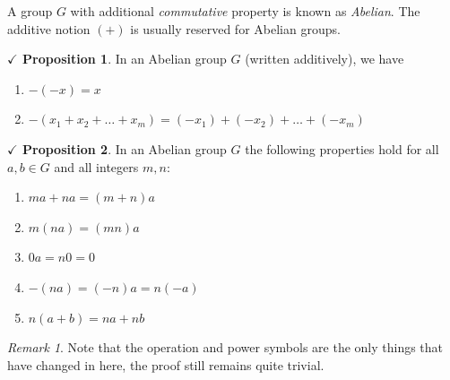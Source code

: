 \documentclass{article}
\theoremstyle{definition}
\theoremstyle{remark}
\newtheorem*{remark}{Remark}
\theoremstyle{definition}
\theoremstyle{definition}
\newtheorem{proposition}{$\checkmark$ Proposition}
\theoremstyle{definition}
\theoremstyle{proof}
\begin{document}
A group $ G $ with additional \emph{commutative} property is known as \emph{Abelian}. The additive notion $ (+) $ is usually reserved for Abelian groups.

\begin{proposition}
	In an Abelian group  $ G $ (written additively), we have
	\begin{enumerate}
		\item{$ -(-x) = x $}
		\item{$ -(x_1 + x_2 + \dots + x_m) = (-x_1) + (-x_2) + \dots + (-x_m) $}
	\end{enumerate}
\end{proposition}
\hrulefill
\begin{proposition}
	In an Abelian group $ G $ the following properties hold for all $ a,b \in G $ and all integers $ m,n $:
	\begin{enumerate}
		\item{$ ma + na = (m+n)a $}
		\item{$ m(na) = (mn) a $}
		\item{$ 0a = n0 = 0 $}
		\item{$ -(na) = (-n)a = n(-a) $}
		\item{$ n(a+b) = na + nb $}
	\end{enumerate}
\end{proposition}
\begin{remark}
	Note that the operation and power symbols are the only things that have changed in here, the proof still remains quite trivial.
\end{remark}
\hrulefill
\newpage
\end{document}
